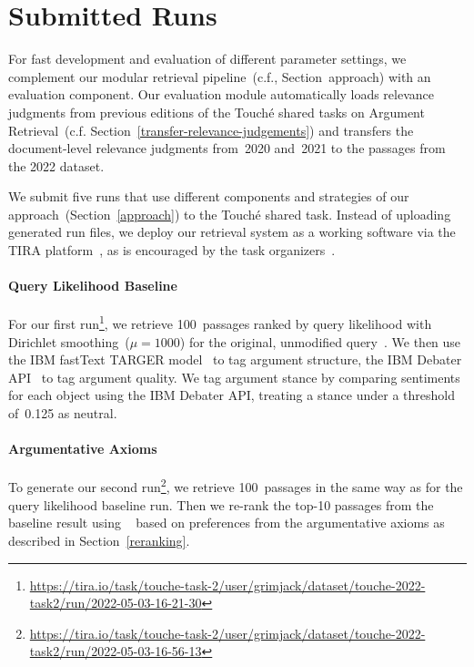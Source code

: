 \section{Submitted Runs}
\label{runs}

For fast development and evaluation of different parameter settings, we complement our modular retrieval pipeline~(c.f., Section~\refname{approach}) with an evaluation component. Our evaluation module automatically loads relevance judgments from previous editions of the Touché shared tasks on Argument Retrieval~(c.f. Section~\ref{transfer-relevance-judgements}) and transfers the document-level relevance judgments from~2020 and~2021 to the passages from the 2022 dataset.

We submit five runs that use different components and strategies of our approach~(Section~\ref{approach}) to the Touché shared task.
Instead of uploading generated run files, we deploy our retrieval system as a working software via the TIRA platform~\cite{PotthastGWS2019}, as is encouraged by the task organizers~\cite{BondarenkoFKSGBPBSWPH2022}.

\paragraph{Query Likelihood Baseline}

For our first run\footnote{\url{https://tira.io/task/touche-task-2/user/grimjack/dataset/touche-2022-task2/run/2022-05-03-16-21-30}}, we retrieve 100~passages ranked by query likelihood with Dirichlet smoothing~(\(\mu = 1000\)) for the original, unmodified query~\cite{ZhaiL2001}. We then use the IBM fastText TARGER model~\cite{ChernodubOHBHBP2019} to tag argument structure,
the IBM Debater API~\cite{ToledoGCFVLJAS2019} to tag argument quality.
We tag argument stance by comparing sentiments for each object using the IBM Debater API, treating a stance under a threshold of~0.125 as neutral.

\paragraph{Argumentative Axioms}

To generate our second run\footnote{\url{https://tira.io/task/touche-task-2/user/grimjack/dataset/touche-2022-task2/run/2022-05-03-16-56-13}}, we retrieve 100~passages in the same way as for the query likelihood baseline run. Then we re-rank the top-10 passages from the baseline result using \KwikSort~\cite{BondarenkoFRSVH2022,HagenVGS2016} based on preferences from the argumentative axioms as described in Section~\ref{reranking}.

